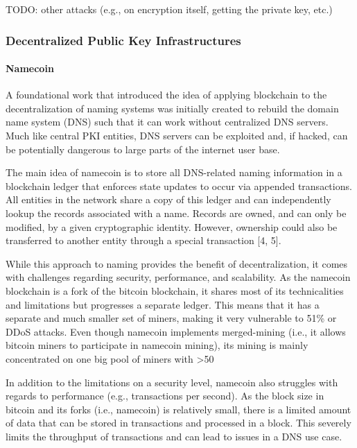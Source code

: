 TODO: other attacks (e.g., on encryption itself, getting the private key, etc.)


\subsubsection{Decentralized Public Key Infrastructures}

\paragraph{Namecoin}

A foundational work that introduced the idea of applying blockchain to the decentralization of naming systems was initially created to rebuild the domain name system (DNS) such that it can work without centralized DNS servers. Much like central PKI entities, DNS servers can be exploited and, if hacked, can be potentially dangerous to large parts of the internet user base.

The main idea of namecoin is to store all DNS-related naming information in a blockchain ledger that enforces state updates to occur via appended transactions. All entities in the network share a copy of this ledger and can independently lookup the records associated with a name. Records are owned, and can only be modified, by a given cryptographic identity. However, ownership could also be transferred to another entity through a special transaction [4, 5].

While this approach to naming provides the benefit of decentralization, it comes with challenges regarding security, performance, and scalability. As the namecoin blockchain is a fork of the bitcoin blockchain, it shares most of its technicalities and limitations but progresses a separate ledger. This means that it has a separate and much smaller set of miners, making it very vulnerable to 51\% or DDoS attacks. Even though namecoin implements merged-mining (i.e., it allows bitcoin miners to participate in namecoin mining), its mining is mainly concentrated on one big pool of miners with >50%

In addition to the limitations on a security level, namecoin also struggles with regards to performance (e.g., transactions per second). As the block size in bitcoin and its forks (i.e., namecoin) is relatively small, there is a limited amount of data that can be stored in transactions and processed in a block. This severely limits the throughput of transactions and can lead to issues in a DNS use case.


